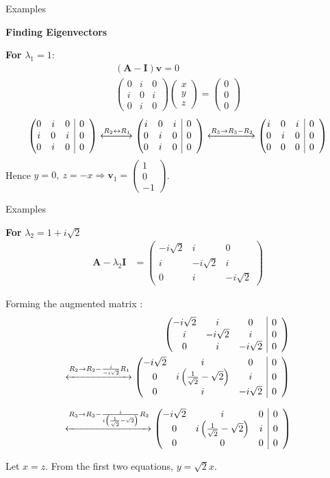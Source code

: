 \documentclass{beamer}
\makeatletter
\numberwithin{equation}{section}
\providecommand{\brak}[1]{\ensuremath{\left(#1\right)}}
\theoremstyle{remark}
\newcommand{\myvec}[1]{\ensuremath{\begin{pmatrix}#1\end{pmatrix}}}
\newenvironment{amatrix}[1]{%
  \left(\begin{array}{@{}*{#1}{c}|*{#1}{c}@{}}
}{%
  \end{array}\right)
}
\newcommand{\myaugvec}[2]{\ensuremath{\begin{amatrix}{#1}#2\end{amatrix}}}
\let\vec\mathbf
\makeatother
\begin{document}
\begin{frame}{Examples}

\textbf{Finding Eigenvectors}

\textbf{For } $\lambda_1 = 1$:
\begin{align}
(\vec{A}-\vec{I})\vec{v}=0\\
\myvec{0 & i & 0\\ i & 0 & i\\ 0 & i & 0}\myvec{x\\y\\z}=\myvec{0\\0\\0}
\end{align}
\begin{align}
  \myaugvec{3}{0 & i & 0 & 0\\ i & 0 & i & 0\\ 0 & i & 0 & 0}
\xleftrightarrow{R_2 \leftrightarrow R_1}
  \myaugvec{3}{i & 0 & i & 0\\ 0 & i & 0 & 0\\ 0 & i & 0 & 0}
\xleftrightarrow{R_3 \to R_3 - R_2}
  \myaugvec{3}{i & 0 & i & 0\\ 0 & i & 0 & 0\\ 0 & 0 & 0 & 0}
\end{align}
Hence $y=0,\ z=-x \Rightarrow \vec{v}_1 = \myvec{1\\0\\-1}$.

\end{frame}

\begin{frame}{Examples}

\textbf{For} \(\lambda_2 = 1 + i\sqrt{2}\)
\begin{align}
\vec{A} - \lambda_2 \vec{I} 
&= \myvec{
 -i\sqrt{2} & i & 0\\
 i & -i\sqrt{2} & i\\
 0 & i & -i\sqrt{2}
}
\end{align}

Forming the augmented matrix :
\begin{align}
\myaugvec{3}{
 -i\sqrt{2} & i & 0 & 0\\
 i & -i\sqrt{2} & i & 0\\
 0 & i & -i\sqrt{2} & 0
}\\
\xleftrightarrow{R_2 \to R_2 - \frac{i}{-i\sqrt{2}} R_1}
\myaugvec{3}{
 -i\sqrt{2} & i & 0 & 0\\
 0 & i\brak{\frac{1}{\sqrt{2}} - \sqrt{2}} & i & 0\\
 0 & i & -i\sqrt{2} & 0
}
\end{align}

\begin{align}
\xleftrightarrow{R_3 \to R_3 - \frac{i}{i\brak{\frac{1}{\sqrt{2}} - \sqrt{2}}} R_2}
\myaugvec{3}{
 -i\sqrt{2} & i & 0 & 0\\
 0 & i\brak{\frac{1}{\sqrt{2}} - \sqrt{2}} & i & 0\\
 0 & 0 & 0 & 0
}
\end{align}

Let \(x = z\). From the first two equations, \(y = \sqrt{2}x\).

\end{frame}
\end{document}
